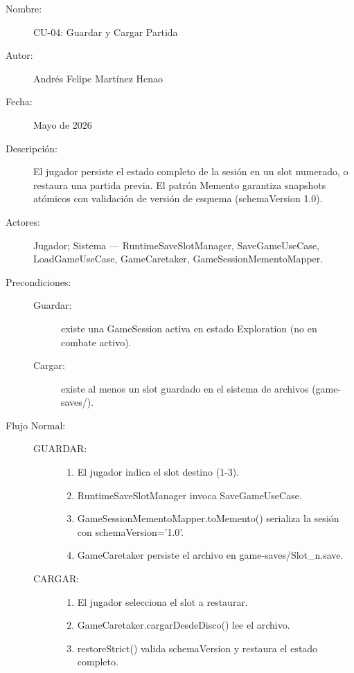\documentclass[stu,12pt,floatsintext]{apa7}
\begin{document}
\begin{description}
    \item[Nombre:] CU-04: Guardar y Cargar Partida
    \item[Autor:] Andrés Felipe Martínez Henao
    \item[Fecha:] Mayo de 2026
    \item[Descripción:] El jugador persiste el estado completo de la sesión en un slot numerado, o restaura una partida previa. El patrón Memento garantiza snapshots atómicos con validación de versión de esquema (schemaVersion 1.0).
    \item[Actores:] Jugador; Sistema — RuntimeSaveSlotManager, SaveGameUseCase, LoadGameUseCase, GameCaretaker, GameSessionMementoMapper.
    \item[Precondiciones:] \hfill
        \begin{description}
            \item[Guardar:] existe una GameSession activa en estado Exploration (no en combate activo).
            \item[Cargar:] existe al menos un slot guardado en el sistema de archivos (game-saves/).
        \end{description}
    \item[Flujo Normal:] \hfill
        \begin{description}
            \item[GUARDAR:] \hfill
                \begin{enumerate}[label=\arabic*.]
                    \item El jugador indica el slot destino (1-3).
                    \item RuntimeSaveSlotManager invoca SaveGameUseCase.
                    \item GameSessionMementoMapper.toMemento() serializa la sesión con schemaVersion='1.0'.
                    \item GameCaretaker persiste el archivo en game-saves/Slot\_n.save.
                \end{enumerate}
            \item[CARGAR:] \hfill
                \begin{enumerate}[label=\arabic*.]
                    \item El jugador selecciona el slot a restaurar.
                    \item GameCaretaker.cargarDesdeDisco() lee el archivo.
                    \item restoreStrict() valida schemaVersion y restaura el estado completo.

\end{enumerate}
\end{description}
\end{description}
\end{document}
